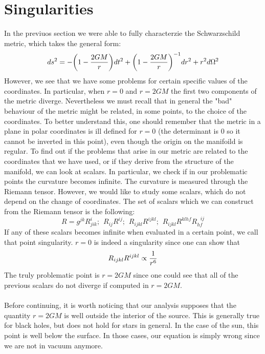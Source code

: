 \documentclass[]{article}
\theoremstyle{definition}
\theoremstyle{Theorem}
\theoremstyle{definition}
\theoremstyle{definition}
\theoremstyle{definition}
\begin{document}
\section{Singularities}
In the previuos section we were able to fully characterzie the Schwarzschild metric, which takes the general form:
$$ds^2=-\bigg(1-{2GM\over r}\bigg)dt^2+\bigg(1-{2GM\over r}\bigg)^{-1}dr^2+r^2d\Omega^2$$
However, we see that we have some problems for certain specific values of the coordinates. In particular, when $r=0$ and $r=2GM$ the first two components of the metric diverge. Nevertheless we must recall that in general the "bad" behaviour of the metric might be related, in some points, to the choice of the coordinates. To better understand this, one should remember that the metric in a plane in polar coordinates is ill defined for $r=0$ (the determinant is 0 so it cannot be inverted in this point), even though the origin on the manifoild is regular. To find out if the problems that arise in our metric are related to the coordinates that we have used, or if they derive from the structure of the manifold, we can look at scalars. In particular, we check if in our problematic points the curvature becomes infinite. The curvature is measured through the Riemann tensor. However, we would like to study some scalars, which do not depend on the change of coordinates. The set of scalars which we can construct from the Riemann tensor is the following:
$$R=g^{jk}R^i_{jik};\hspace{5pt}R_{ij}R^{ij};\hspace{5pt}R_{ijkl}R^{ijkl};\hspace{5pt}R_{ijkl}R^{klhf}R_{hf}^{\hspace{8pt} ij}$$ 
If any of these scalars becomes infinite when evaluated in a certain point, we call that point singularity.
$r=0$ is indeed a singularity since one can show that
$$R_{ijkl}R^{ijkl}\propto {1\over r^6}$$
The truly problematic point is $r=2GM$ since one could see that all of the previous scalars do not diverge if computed in $r=2GM$.\\
\\
Before continuing, it is worth noticing that our analysis supposes that the quantity $r=2GM$ is well outside the interior of the source. This is generally true for black holes, but does not hold for stars in general. In the case of the sun, this point is well below the surface. In those cases, our equation is simply wrong since we are not in vacuum anymore.
\end{document}
